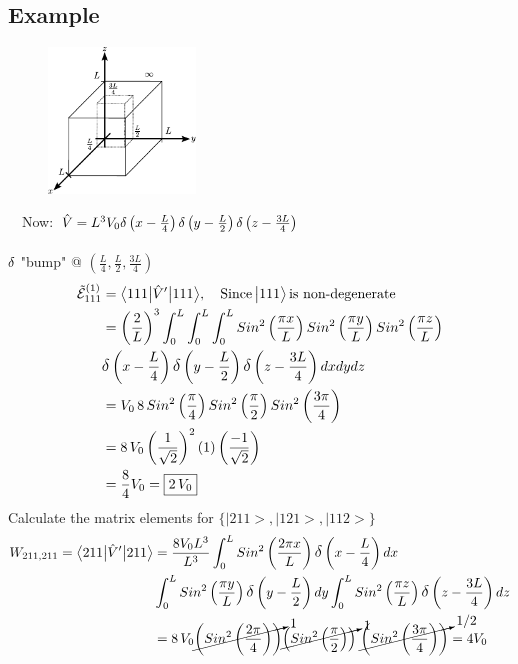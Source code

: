 \documentclass[12pt,fancychapters]{report}
\numberwithin{equation}{section}
\begin{document}
\subsection*{Example}
\begin{figure}
  \begin{center}
\includegraphics[width=0.35\textwidth]{../Figures/BOX4.pdf}
  \end{center}
\end{figure}
\
\
Now: $\hat{V} = L^3V_0 \mathlarger{\delta}\left(x-\frac{L}{4}\right)
\mathlarger{\delta}\left(y-\frac{L}{2}\right)
\mathlarger{\delta}\left(z-\frac{3L}{4}\right)$\\
\\
$\mathlarger{\delta}$ "bump" @ $\left(\frac{L}{4}, \frac{L}{2}, \frac{3L}{4}\right)$
\begin{align*}
  \tilde{\mathcal{E}}_{111}^{(1)} &= \big<111\big|\hat{V}'\big|111 \big>, \quad \text{Since}\,
  \big|111\big>\, \text{is non-degenerate}\\
  &= \left(\frac{2}{L}\right)^3\int_{0}^{L}\int_{0}^{L}
  \int_{0}^{L}Sin^2\left(\frac{\pi x}{L}\right)Sin^2\left(\frac{\pi y}{L}\right)Sin^2
  \left(\frac{\pi z}{L}\right)\\
   &\mathlarger{\delta}\left(x-\frac{L}{4}\right)
\mathlarger{\delta}\left(y-\frac{L}{2}\right)
\mathlarger{\delta}\left(z-\frac{3L}{4}\right)dxdydz\\
&= V_0\,8\,Sin^2\left(\frac{\pi}{4}\right)Sin^2\left(\frac{\pi}{2}\right)
Sin^2\left(\frac{3\pi}{4}\right)\\
&= 8\,V_0\left(\frac{1}{\sqrt{2}}\right)^2 (1) \left(\frac{-1}{\sqrt{2}}\right)\\
&= \frac{8}{4}V_0 = \boxed{2\,V_0}
\end{align*}
Calculate the matrix elements for $\{\big|211\big>, \big|121\big>, \big|112\big> \}$
\begin{align*}
  W_{211,211} =\big<211\big|\hat{V}'\big|211 \big> &= \frac{8V_0L^3}{L^3}\int_{0}^{L}
  Sin^2\left(\frac{2\pi x}{L}\right)\mathlarger{\delta}\left(x-\frac{L}{4}\right)dx\\
  &\int_{0}^{L}
  Sin^2\left(\frac{\pi y}{L}\right)\mathlarger{\delta}\left(y-\frac{L}{2}\right)dy
  \int_{0}^{L}
  Sin^2\left(\frac{\pi z}{L}\right)\mathlarger{\delta}\left(z-\frac{3L}{4}\right)dz\\
  &= 8\,V_0\cancelto{1}{\left(Sin^2\left(\frac{2\pi}{4}\right)\right)}
  \cancelto{1}{\left(Sin^2\left(\frac{\pi}{2}\right)\right)}\,\,
  \cancelto{1/2}{\left(Sin^2\left(\frac{3\pi}{4}\right)\right)} = 4V_0
\end{align*}
\end{document}
